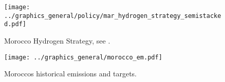 \begin{figure}
    \centering
    \texttt{[image: ../graphics\_general/policy/mar\_hydrogen\_strategy\_semistacked.pdf]}
    \caption{Morocco Hydrogen Strategy, see \cite{MarHyStrat2021}.}
    \label{fig:mar_hydrogen_strategy}
\end{figure}


\begin{figure}[h!]
    \centering
    \texttt{[image: ../graphics\_general/morocco\_em.pdf]}
    \caption{Moroccos historical emissions and targets.}
    \label{fig:morocco_em}
\end{figure}
